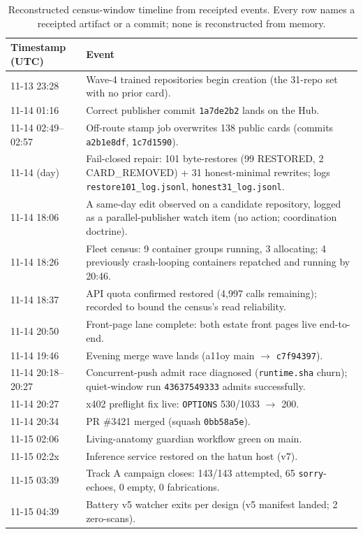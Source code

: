 \begin{table}[htbp]
\centering
\small
\begin{tabular}{lp{9.6cm}}
\toprule
\textbf{Timestamp (UTC)} & \textbf{Event} \\
\midrule
11-13 23:28 & Wave-4 trained repositories begin creation (the 31-repo set with no prior card). \\
11-14 01:16 & Correct publisher commit \texttt{1a7de2b2} lands on the Hub. \\
11-14 02:49--02:57 & Off-route stamp job overwrites 138 public cards (commits \texttt{a2b1e8df}, \texttt{1c7d1590}). \\
11-14 (day) & Fail-closed repair: 101 byte-restores (99 RESTORED, 2 CARD\_REMOVED) + 31 honest-minimal rewrites; logs \texttt{restore101\_log.jsonl}, \texttt{honest31\_log.jsonl}. \\
11-14 18:06 & A same-day edit observed on a candidate repository, logged as a parallel-publisher watch item (no action; coordination doctrine). \\
11-14 18:26 & Fleet census: 9 container groups running, 3 allocating; 4 previously crash-looping containers repatched and running by 20:46. \\
11-14 18:37 & API quota confirmed restored (4,997 calls remaining); recorded to bound the census's read reliability. \\
11-14 20:50 & Front-page lane complete: both estate front pages live end-to-end. \\
11-14 19:46 & Evening merge wave lands (a11oy main $\to$ \texttt{c7f94397}). \\
11-14 20:18--20:27 & Concurrent-push admit race diagnosed (\texttt{runtime.sha} churn); quiet-window run \texttt{43637549333} admits successfully. \\
11-14 20:27 & x402 preflight fix live: \texttt{OPTIONS} 530/1033 $\to$ 200. \\
11-14 20:34 & PR \#3421 merged (squash \texttt{0bb58a5e}). \\
11-15 02:06 & Living-anatomy guardian workflow green on main. \\
11-15 02:2x & Inference service restored on the hatun host (v7). \\
11-15 03:39 & Track A campaign closes: 143/143 attempted, 65 \texttt{sorry}-echoes, 0 empty, 0 fabrications. \\
11-15 04:39 & Battery v5 watcher exits per design (v5 manifest landed; 2 zero-scans). \\
\bottomrule
\end{tabular}
\caption{Reconstructed census-window timeline from receipted events. Every row names a receipted artifact or a commit; none is reconstructed from memory.}
\label{tab:timeline}
\end{table}

